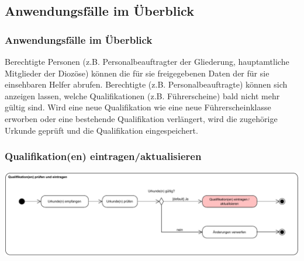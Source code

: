 \documentclass{beamer}
\begin{document}
\subsection{Anwendungsfälle im Überblick}		
\begin{frame}
\frametitle{Anwendungsfälle im Überblick}
\begin{acronym}
	 {Berechtigte Personen (z.B. Personalbeauftragter der Gliederung, hauptamtliche Mitglieder der Diozöse) können die für sie freigegebenen Daten der für sie einsehbaren Helfer abrufen.}
	 {Berechtigte (z.B. Personalbeauftragte) können sich anzeigen lassen, welche Qualifikationen (z.B. Führerscheine) bald nicht mehr gültig sind.}
		 {Wird eine neue Qualifikation wie eine neue Führerscheinklasse erworben oder eine bestehende Qualifikation verlängert, wird die zugehörige Urkunde geprüft und die Qualifikation eingespeichert.}
	\end{acronym}
\end{frame}

\begin{frame}
\frametitle{Qualifikation(en) eintragen/aktualisieren}
\includegraphics[width=\textwidth]{PDF/BusinessP/Qualifikation_eintragen.pdf}
\end{frame}
\end{document}
